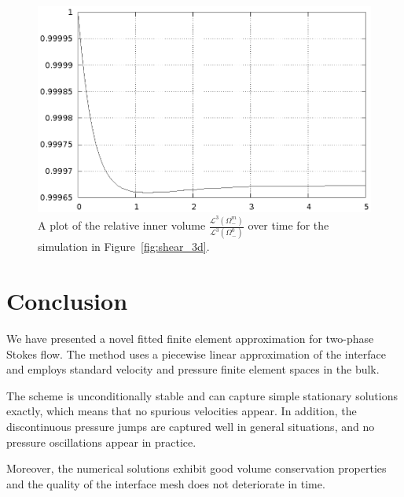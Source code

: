 \documentclass[a4paper,12pt,onecolumn]{article}
\begin{document}
\begin{figure}[htbp]
\centering
\includegraphics[width=.45\textwidth]{figures/3d_shear_bulk_inner_volume.ps}
\caption{A plot of the relative inner volume
$\frac{\mathcal{L}^3(\Omega^m_-)}{\mathcal{L}^3(\Omega^0_-)}$
over time for the simulation in Figure~\ref{fig:shear_3d}.}
\label{fig:shear_3d_bulk_inner_volume}
\end{figure}

\section{Conclusion}\label{sec:conclusion}
We have presented a novel fitted finite element approximation for two-phase
Stokes flow. The method uses a piecewise linear approximation of the interface
and employs standard velocity and pressure finite element spaces in the bulk.

The scheme is unconditionally stable and can capture simple stationary
solutions exactly, which means that no spurious velocities appear. In addition,
the discontinuous pressure jumps are captured well in general situations, and
no pressure oscillations appear in practice.

Moreover, the numerical solutions exhibit good volume conservation properties
and the quality of the interface mesh does not deteriorate in time.



\end{document}
